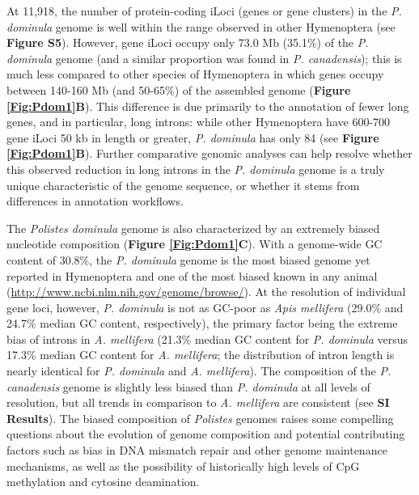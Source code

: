 At 11,918, the number of protein-coding iLoci (genes or gene clusters)
in the \textit{P. dominula} genome is well within the range observed in
other Hymenoptera (see \textbf{Figure S5}). However, gene iLoci occupy
only 73.0 Mb (35.1\%) of the \textit{P. dominula} genome (and a similar
proportion was found in \textit{P. canadensis}); this is much less
compared to other species of Hymenoptera in which genes occupy between
140-160 Mb (and 50-65\%) of the assembled genome (\textbf{Figure \ref{Fig:Pdom1}B}).
This difference is due primarily to the annotation of fewer long genes,
and in particular, long introns: while other Hymenoptera have 600-700
gene iLoci 50 kb in length or greater, \textit{P. dominula} has only 84
(see \textbf{Figure \ref{Fig:Pdom1}B}). Further comparative genomic analyses can help
resolve whether this observed reduction in long introns in the \textit{P.
dominula} genome is a truly unique characteristic of the genome
sequence, or whether it stems from differences in annotation workflows.

The \textit{Polistes dominula} genome is also characterized by an
extremely biased nucleotide composition (\textbf{Figure \ref{Fig:Pdom1}C}). With a
genome-wide GC content of 30.8\%, the \textit{P. dominula} genome is the
most biased genome yet reported in Hymenoptera \cite{Bonasio2010,Nygaard2011,LhumGenome,PbarGenome,AcepGenome,HoneybeeGenome,Werren2010} and one
of the most biased known in any animal
(\url{http://www.ncbi.nlm.nih.gov/genome/browse/}). At the resolution of
individual gene loci, however, \textit{P. dominula} is not as GC-poor as
\textit{Apis mellifera} (29.0\% and 24.7\% median GC content,
respectively), the primary factor being the extreme bias of introns in
\textit{A. mellifera} (21.3\% median GC content for \textit{P. dominula}
versus 17.3\% median GC content for \textit{A. mellifera}; the
distribution of intron length is nearly identical for \textit{P. dominula}
and \textit{A. mellifera}). The composition of the \textit{P. canadensis}
genome is slightly less biased than \textit{P. dominula} at all levels of
resolution, but all trends in comparison to \textit{A. mellifera} are
consistent (see \textbf{SI Results}). The biased composition of
\textit{Polistes} genomes raises some compelling questions about the
evolution of genome composition and potential contributing factors such
as bias in DNA mismatch repair and other genome maintenance mechanisms,
as well as the possibility of historically high levels of CpG
methylation and cytosine deamination.

